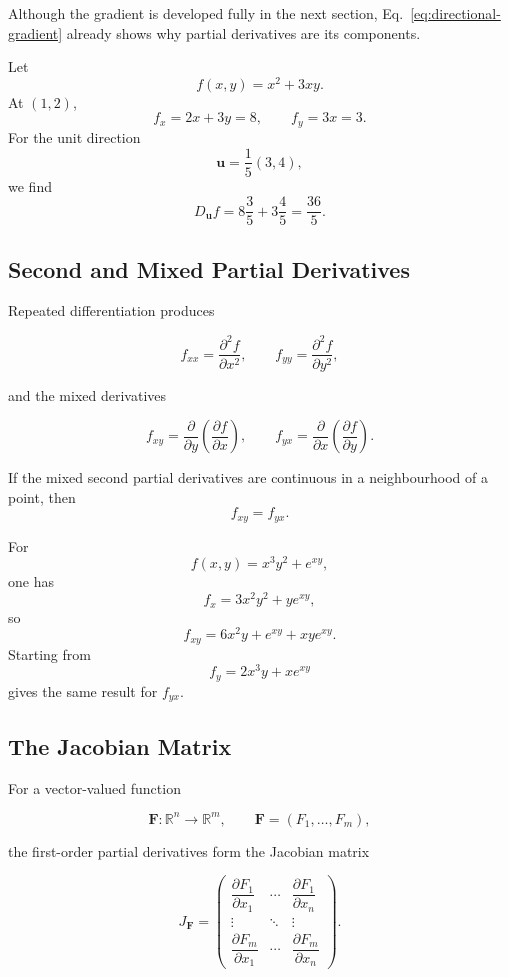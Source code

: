 Although the gradient is developed fully in the next section, Eq.~\eqref{eq:directional-gradient} already shows why partial derivatives are its components.

\begin{bookexample}
Let
\[
f(x,y)=x^2+3xy.
\]
At $(1,2)$,
\[
f_x=2x+3y=8,
\qquad
f_y=3x=3.
\]
For the unit direction
\[
\mathbf u=\frac{1}{5}(3,4),
\]
we find
\[
D_{\mathbf u}f
=8\frac35+3\frac45
=\frac{36}{5}.
\]
\end{bookexample}

\subsection{Second and Mixed Partial Derivatives}

Repeated differentiation produces

\[
f_{xx}=\frac{\partial^2f}{\partial x^2},
\qquad
f_{yy}=\frac{\partial^2f}{\partial y^2},
\]

and the mixed derivatives

\[
f_{xy}=\frac{\partial}{\partial y}\left(\frac{\partial f}{\partial x}\right),
\qquad
f_{yx}=\frac{\partial}{\partial x}\left(\frac{\partial f}{\partial y}\right).
\]

\begin{bookproperty}
If the mixed second partial derivatives are continuous in a neighbourhood of a point, then
\[
\boxed{f_{xy}=f_{yx}.}
\]
\end{bookproperty}

\begin{bookexample}
For
\[
f(x,y)=x^3y^2+e^{xy},
\]
one has
\[
f_x=3x^2y^2+ye^{xy},
\]
so
\[
f_{xy}=6x^2y+e^{xy}+xye^{xy}.
\]
Starting from
\[
f_y=2x^3y+xe^{xy}
\]
gives the same result for $f_{yx}$.
\end{bookexample}

\subsection{The Jacobian Matrix}

For a vector-valued function

\[
\mathbf F:\mathbb R^n\to\mathbb R^m,
\qquad
\mathbf F=(F_1,\ldots,F_m),
\]

the first-order partial derivatives form the Jacobian matrix

\begin{equation}
\boxed{
J_{\mathbf F}
=
\begin{pmatrix}
\dfrac{\partial F_1}{\partial x_1} & \cdots & \dfrac{\partial F_1}{\partial x_n}\\[6pt]
\vdots & \ddots & \vdots\\[6pt]
\dfrac{\partial F_m}{\partial x_1} & \cdots & \dfrac{\partial F_m}{\partial x_n}
\end{pmatrix}.
}
\label{eq:jacobian-matrix}
\end{equation}

